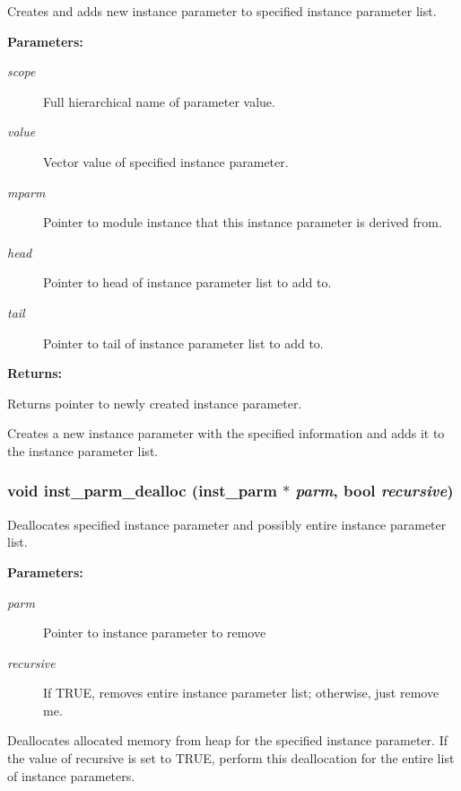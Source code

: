 Creates and adds new instance parameter to specified instance parameter list.

\begin{Desc}
\item[{\bf Parameters: }]\par
\begin{description}
\item[
{\em scope}]Full hierarchical name of parameter value. \item[
{\em value}]Vector value of specified instance parameter. \item[
{\em mparm}]Pointer to module instance that this instance parameter is derived from. \item[
{\em head}]Pointer to head of instance parameter list to add to. \item[
{\em tail}]Pointer to tail of instance parameter list to add to.

\end{description}
\end{Desc}
\begin{Desc}
\item[{\bf Returns: }]\par
Returns pointer to newly created instance parameter.

\end{Desc}
Creates a new instance parameter with the specified information and adds  it to the instance parameter list. 
\subsubsection{\setlength{\rightskip}{0pt plus 5cm}void inst\_\-parm\_\-dealloc ({\bf inst\_\-parm} $\ast$ {\em parm}, {\bf bool} {\em recursive})}\label{param_8h_a14}


Deallocates specified instance parameter and possibly entire instance parameter list.

\begin{Desc}
\item[{\bf Parameters: }]\par
\begin{description}
\item[
{\em parm}]Pointer to instance parameter to remove \item[
{\em recursive}]If TRUE, removes entire instance parameter list; otherwise, just remove me.

\end{description}
\end{Desc}
Deallocates allocated memory from heap for the specified instance parameter. If the value of recursive is set to TRUE, perform this deallocation for the entire list of instance parameters. 
